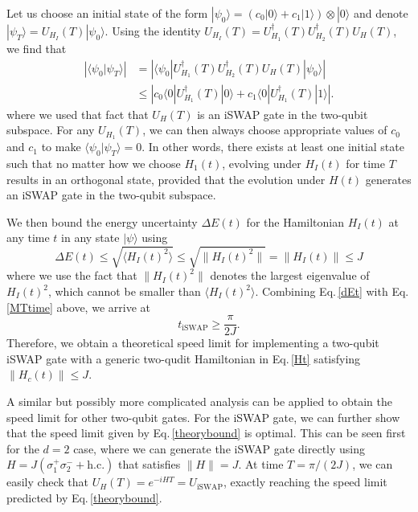 \documentclass[twocolumn,english,pra,superscriptaddress]{revtex4-1}
\begin{document}
Let us choose an initial state of the form $|\psi_0\rangle = (c_0 |0\rangle + c_1 |1\rangle) \otimes |0\rangle$ and denote $|\psi_T\rangle = U_{H_I}(T)|\psi_0\rangle$. Using the identity $ U_{H_I}(T)= U_{H_1}^{\dagger}(T) U_{H_2}^{\dagger}(T) U_{H}(T)$, we find that
\begin{align}
\left|\langle\psi_0|\psi_T\rangle\right| &=\left|\langle\psi_0|U_{H_{1}}^{\dagger}(T)U_{H_{2}}^{\dagger}(T) U_{H}(T)|\psi_0\rangle\right| \nonumber \\
&\le\left|c_{0}\langle0|U_{H_{1}}^{\dagger}(T)|0\rangle+c_{1}\langle0|U_{H_{1}}^{\dagger}(T)|1\rangle\right|.
\end{align}
where we used that fact that $U_{H}(T)$ is an iSWAP gate in the two-qubit subspace. For any $U_{H_{1}}(T)$, we can then always choose appropriate values of $c_0$ and $c_1$ to make $\langle\psi_0|\psi_T\rangle=0$. In other words, there exists at least one initial state such that no matter how we choose $H_1(t)$, evolving under $H_I(t)$ for time $T$ results in an orthogonal state, provided that the evolution under $H(t)$ generates an iSWAP gate in the two-qubit subspace.

We then bound the energy uncertainty $\Delta E(t)$ for the Hamiltonian $H_I(t)$ at any time $t$ in any state $|\psi\rangle$ using
\begin{equation} \label{dEt}
   \Delta E(t) \le \sqrt{\langle H_I(t)^2 \rangle}  \le \sqrt{\lVert H_I(t)^2 \rVert} = \lVert H_I(t) \rVert \le J 
\end{equation}
where we use the fact that $\lVert H_I(t)^2 \rVert$ denotes the largest eigenvalue of $H_I(t)^2$, which cannot be smaller than $\langle H_I(t)^2 \rangle$. Combining Eq.\,\eqref{dEt} with Eq.\,\eqref{MTtime} above, we arrive at
\begin{equation} \label{theorybound}
   t_{\text{iSWAP}} \ge \frac{\pi}{2J}.
\end{equation}
Therefore, we obtain a theoretical speed limit for implementing a two-qubit iSWAP gate with a generic two-qudit Hamiltonian in Eq.\,\eqref{Ht} satisfying $\lVert H_c(t) \rVert \le J$. 

A similar but possibly more complicated analysis can be applied to obtain the speed limit for other two-qubit gates. For the iSWAP gate, we can further show that the speed limit given by Eq.\,\eqref{theorybound} is optimal. This can be seen first for the $d=2$ case, where we can generate the iSWAP gate directly using $H = J (\sigma_1^+ \sigma_2^- + \text{h.c.})$ that satisfies $\lVert H \rVert = J$. At time $T=\pi/(2J)$, we can easily check that $U_H(T)=e^{-i H T}=U_{\text{iSWAP}}$, exactly reaching the speed limit predicted by Eq.\,\eqref{theorybound}.
\end{document}
